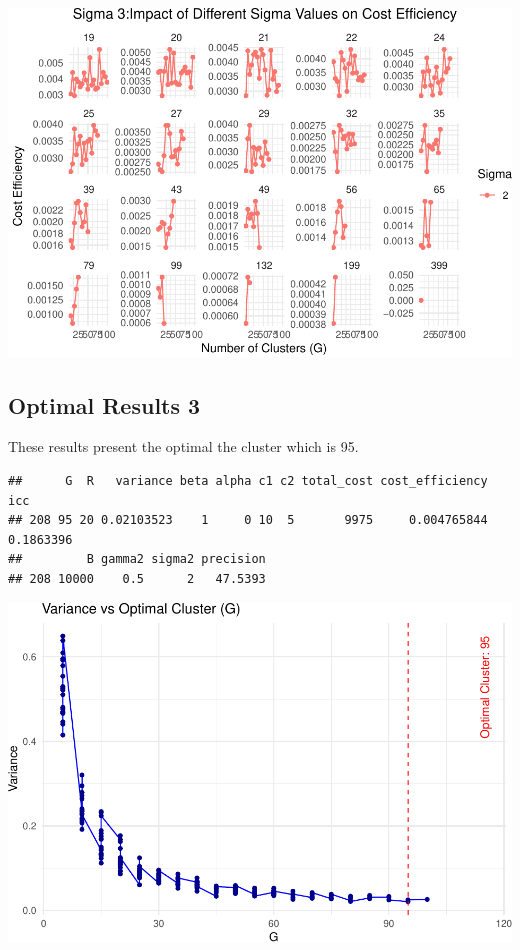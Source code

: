 \documentclass[
]{article}
\begin{document}
\begin{center}\includegraphics{Project3Simulation_files/figure-latex/unnamed-chunk-10-2} \end{center}

\hypertarget{optimal-results-3}{%
\subsection{Optimal Results 3}\label{optimal-results-3}}

These results present the optimal the cluster which is 95.

\begin{verbatim}
##      G  R   variance beta alpha c1 c2 total_cost cost_efficiency       icc
## 208 95 20 0.02103523    1     0 10  5       9975     0.004765844 0.1863396
##         B gamma2 sigma2 precision
## 208 10000    0.5      2   47.5393
\end{verbatim}

\begin{center}\includegraphics{Project3Simulation_files/figure-latex/unnamed-chunk-11-1} \end{center}
\end{document}
